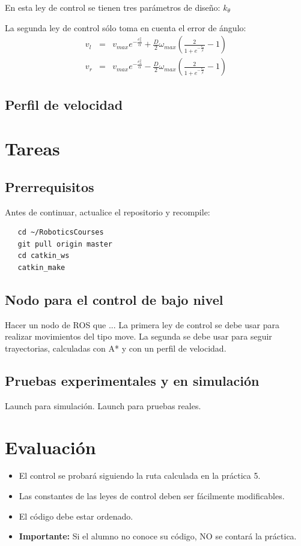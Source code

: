 \documentclass[letterpaper,12pt]{article}
\begin{document}
En esta ley de control se tienen tres parámetros de diseño: $k_{\theta}$ 

La segunda ley de control sólo toma en cuenta el error de ángulo:
\begin{eqnarray} 
v_{l} &=& v_{max}e^{-\frac{e_{a}^{2}}{\alpha}} + 
\frac{D}{2}\omega_{max}\left(\frac{2}{1+e^{-\frac{e_a}{\beta}}}-1\right)\label{eq:Control21}\\
v_{r} &=& v_{max}e^{-\frac{e_{a}^{2}}{\alpha}} -
\frac{D}{2}\omega_{max}\left(\frac{2}{1+e^{-\frac{e_a}{\beta}}}-1\right)\label{eq:Control22}
\end{eqnarray}


\subsection{Perfil de velocidad}

\section{Tareas}

\subsection{Prerrequisitos}
Antes de continuar, actualice el repositorio y recompile:
\begin{verbatim}
   cd ~/RoboticsCourses
   git pull origin master
   cd catkin_ws
   catkin_make
\end{verbatim}

\subsection{Nodo para el control de bajo nivel}
Hacer un nodo de ROS que ...
La primera ley de control se debe usar para realizar movimientos del tipo move.
La segunda se debe usar para seguir trayectorias, calculadas con A* y con un perfil de velocidad. 

\subsection{Pruebas experimentales y en simulación}
Launch para simulación. Launch para pruebas reales.

\section{Evaluación}
\begin{itemize}
\item El control se probará siguiendo la ruta calculada en la práctica 5. 
\item Las constantes de las leyes de control deben ser fácilmente modificables. 
\item El código debe estar ordenado.
\item \textbf{Importante: } Si el alumno no conoce su código, NO se contará la práctica.
\end{itemize}
\end{document}
